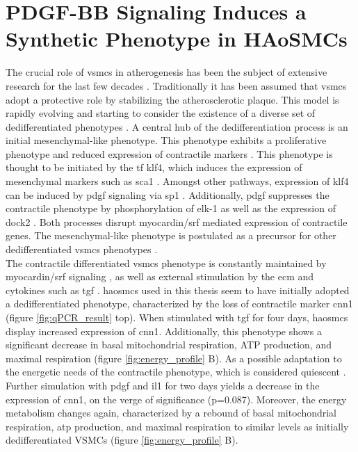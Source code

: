 \section{PDGF-BB Signaling Induces a Synthetic Phenotype in HAoSMCs}
The crucial role of \acp{vsmc} in atherogenesis has been the subject of extensive research for the last few decades \cite{grootaertVascularSmoothMuscle2021, yapSixShadesVascular2021}. Traditionally it has been assumed that \acp{vsmc} adopt a protective role by stabilizing the atherosclerotic plaque. This model is rapidly evolving and starting to consider the existence of a diverse set of dedifferentiated phenotypes \cite{liuSmoothMuscleCell2019}. A central hub of the dedifferentiation process is an initial mesenchymal-like phenotype. This phenotype exhibits a proliferative phenotype and reduced expression of contractile markers \cite{yapSixShadesVascular2021}. This phenotype is thought to be initiated by the \ac{tf} \ac{klf4}, which induces the expression of mesenchymal markers such as \ac{sca1} \cite{yapSixShadesVascular2021}. Amongst other pathways, expression of \ac{klf4} can be induced by \ac{pdgf} signaling \cite{liuKruppellikeFactorAbrogates2005} via \ac{sp1} \cite{deatonSp1dependentActivationKLF42009}. Additionally, \ac{pdgf} suppresses the contractile phenotype by phosphorylation of \ac{elk-1} \cite{wangMyocardinTernaryComplex2004} as well as the expression of \ac{dock2} \cite{guoDedicatorCytokinesisNovel2015}. Both processes disrupt myocardin/\ac{srf} mediated expression of contractile genes. The mesenchymal-like phenotype is postulated as a precursor for other dedifferentiated \acp{vsmc} phenotypes \cite{yapSixShadesVascular2021}.\\
The contractile differentiated \acp{vsmc} phenotype is constantly maintained by myocardin/\ac{srf} signaling \cite{longMyocardinSufficientSmooth2008}, as well as external stimulation by the \ac{ecm} and cytokines such as \ac{tgf} \cite{davis-dusenberyDownregulationKruppellikeFactor42011}. \acp{haosmc} used in this thesis seem to have initially adopted a dedifferentiated phenotype, characterized by the loss of contractile marker \ac{cnn1} \cite{owensMolecularRegulationVascular2004} (figure \ref{fig:qPCR_result} top). When stimulated with \ac{tgf} for four days, \acp{haosmc} display increased expression of \ac{cnn1}. Additionally, this phenotype shows a significant decrease in  basal mitochondrial respiration, ATP production, and maximal respiration (figure \ref{fig:energy_profile} B). As a possible adaptation to the energetic needs of the contractile phenotype, which is considered quiescent \cite{dobnikarDiseaserelevantTranscriptionalSignatures2018}. Further simulation with \ac{pdgf} and \ac{il1} for two days yields a decrease in the expression of \ac{cnn1}, on the verge of significance (p=0.087). Moreover, the energy metabolism changes again, characterized by a rebound of basal mitochondrial respiration, \ac{atp} production, and maximal respiration to similar levels as initially dedifferentiated VSMCs (figure \ref{fig:energy_profile} B).\\
